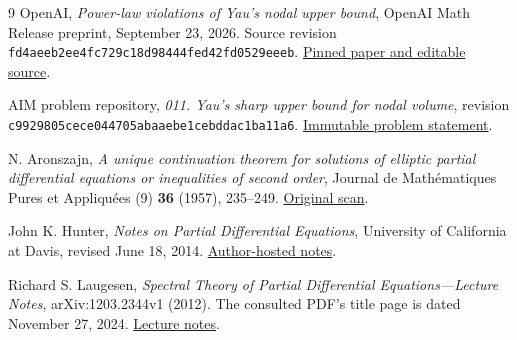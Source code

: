 \documentclass[11pt]{article}
\theoremstyle{definition}
\theoremstyle{remark}
\numberwithin{equation}{section}
\begin{document}
\begin{thebibliography}{9}
OpenAI,
\emph{Power-law violations of Yau's nodal upper bound},
OpenAI Math Release preprint, September 23, 2026.
Source revision \texttt{fd4aeeb2ee4fc729c18d98444fed42fd0529eeeb}.
\href{https://github.com/openai/math/tree/fd4aeeb2ee4fc729c18d98444fed42fd0529eeeb/preprints/Power-law-violations-of-Yaus-nodal-upper-bound-September-23-2026}{Pinned paper and editable source}.

AIM problem repository,
\emph{011. Yau's sharp upper bound for nodal volume},
revision \texttt{c9929805cece044705abaaebe1cebddac1ba11a6}.
\href{https://github.com/MColbrook/AIM/blob/c9929805cece044705abaaebe1cebddac1ba11a6/problems/011-yau-nodal-upper-bound.md}{Immutable problem statement}.

N. Aronszajn,
\emph{A unique continuation theorem for solutions of elliptic partial
differential equations or inequalities of second order},
Journal de Math\'ematiques Pures et Appliqu\'ees (9) \textbf{36}
(1957), 235--249.
\href{https://sites.math.washington.edu/~blwilson/Nodal/Aronszajn.pdf}{Original scan}.

John K. Hunter,
\emph{Notes on Partial Differential Equations},
University of California at Davis, revised June 18, 2014.
\href{https://www.math.ucdavis.edu/~hunter/pdes/pde_notes.pdf}{Author-hosted notes}.

Richard S. Laugesen,
\emph{Spectral Theory of Partial Differential Equations---Lecture Notes},
arXiv:1203.2344v1 (2012).
The consulted PDF's title page is dated November 27, 2024.
\href{https://arxiv.org/pdf/1203.2344}{Lecture notes}.
\end{thebibliography}
\end{document}
